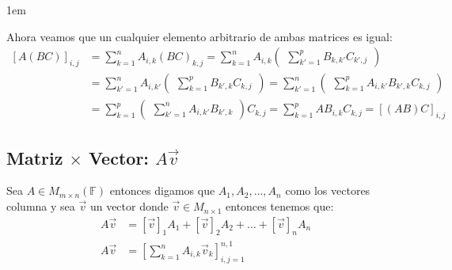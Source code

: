 \documentclass[12pt, fleqn]{report}                             %
\newenvironment{SmallIndentation}[1][0.75em]                    %
    {\begin{adjustwidth}{#1}{}\begin{footnotesize}}                 %
    {\end{footnotesize}\end{adjustwidth}}                           %
\newcommand{\Brackets}[1]{\left[ #1 \right]}                    %
\newcommand{\pVector}[1]{                                       %
        \ensuremath{\begin{pmatrix}#1\end{pmatrix}}                 %
    }
\begin{document}
\begin{itemize}
\begin{SmallIndentation}[1em]
                            Ahora veamos que un cualquier elemento arbitrario de ambas matrices es igual:
                            \begin{equation*}
                            \begin{split}
                                [A(BC)]_{i, j}    
                                    &= \sum_{k=1}^n A_{i, k} (BC)_{k, j}  
                                     = \sum_{k=1}^n A_{i, k} \pVector{\sum_{k'=1}^p B_{k, k'} C_{k', j} }   \\
                                    &= \sum_{k'=1}^n A_{i, k'} \pVector{\sum_{k=1}^p B_{k', k} C_{k, j} }   
                                     = \sum_{k'=1}^n \pVector{\sum_{k=1}^p A_{i, k'} B_{k', k} C_{k, j} }   \\
                                    &= \sum_{k=1}^p \pVector{\sum_{k'=1}^n A_{i,k'} B_{k',k} } C_{k, j}  
                                     = \sum_{k=1}^p AB_{i, k} C_{k, j}
                                     = [(AB)C]_{i, j}
                            \end{split}
                            \end{equation*}

                        \end{SmallIndentation}

                \end{itemize}




            \clearpage
            \subsection{Matriz $\times$ Vector: $A\vec{v}$}
                Sea $A \in M_{m \times n}(\mathbb{F})$ entonces digamos que $A_1, A_2, \dots, A_n$ como
                los vectores columna y sea $\vec{v}$ un vector donde $\vec{v} \in M_{n \times 1}$
                entonces tenemos que:
                \begin{equation}
                \begin{split}
                    A\vec{v} &= [\vec{v}]_1 A_1 + [\vec{v}]_2 A_2 + \dots + [\vec{v}]_n A_n     \\
                    A\vec{v} &= \Brackets{ \sum_{k=1}^{n}A_{i, k} \vec{v}_k }_{i, j = 1}^{n, 1}
                \end{split}
                \end{equation}
\end{document}
